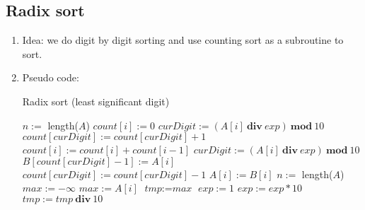 \documentclass[12pt]{article}
\begin{document}
    \subsection{Radix sort}
    \begin{enumerate}
        \item Idea: we do digit by digit sorting and use counting sort as a subroutine to sort.
        \item Pseudo code:
        \begin{algorithm}[H]
            \caption{Radix sort (least significant digit)}
            \begin{algorithmic}[1]
                    \State $n:=$ length($A$)
                        \State $\textit{count}[i]:=0$
                    \EndFor
                        \State $\textit{curDigit}:=(A[i]\ \textbf{div}\ exp)\ \textbf{mod}\ 10$
                        \State $\textit{count}[\textit{curDigit}]:=\textit{count}[\textit{curDigit}]+1$
                    \EndFor
                        \State $\textit{count}[i]:=\textit{count}[i]+\textit{count}[i-1]$
                    \EndFor
                        \State $\textit{curDigit}:=(A[i]\ \textbf{div}\ exp)\ \textbf{mod}\ 10$
                        \State $B[\textit{count}[\textit{curDigit}]-1]:=A[i]$
                        \State $\textit{count}[\textit{curDigit}]:=\textit{count}[\textit{curDigit}]-1$
                    \EndFor
                        \State $A[i]:=B[i]$
                    \EndFor
                \EndFunction
                \State
                \State $n:=$ length($A$)
                \State $\textit{max}:=-\infty$
                        \State $\textit{max}:=A[i]$
                    \EndIf
                \EndFor 
                \State $\textit{tmp}:=\textit{max}$
                \State $\textit{exp}:=1$
                    \State {}
                    \State $\textit{exp}:=\textit{exp}*10$
                    \State $\textit{tmp}:=\textit{tmp}\ \textbf{div}\ 10$
                \EndWhile
                \EndFunction
            \end{algorithmic}

\end{algorithm}
\end{enumerate}
\end{document}
